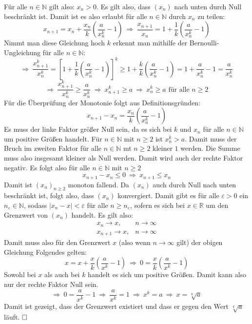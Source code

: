 \documentclass[10pt, a4paper]{article}
\begin{document}
		Für alle $n \in \mathbb{N}$ gilt also: $x_n > 0$. Es gilt also, dass $(x_n)$ nach unten durch Null beschränkt ist. Damit ist es also erlaubt für alle $n \in \mathbb{N}$ durch $x_n$ zu teilen:
		\[
			x_{n+1} = x_n + \frac{x_n}{k}\left( \frac{a}{x_n^k} - 1 \right) \ \Rightarrow \ \dfrac{x_{n+1}}{x_n} = 1 + \dfrac{1}{k}\left( \frac{a}{x_n^k} - 1 \right)
		\]
		Nimmt man diese Gleichung hoch $k$ erkennt man mithilfe der Bernoulli-Ungleichung für alle $n \in \mathbb{N}$:
		\[
			\Rightarrow \ \dfrac{x_{n+1}^k}{x_n^k} = \left[ 1 + \dfrac{1}{k}\left( \frac{a}{x_n^k} - 1 \right) \right]^k \geq 1 + \dfrac{k}{k}\left( \frac{a}{x_n^k} - 1 \right) = 1 + \frac{a}{x_n^k} -1 = \frac{a}{x_n^k}
		\]
		\[
			\Rightarrow \ \dfrac{x_{n+1}^k}{x_n^k} \geq \frac{a}{x_n^k} \ \Rightarrow \ x_{n+1}^k \geq a \ \Rightarrow \ x_n^k \geq a \text{ für alle } n \geq 2
		\]
		Für die Überprüfung der Monotonie folgt aus Definitionsgründen:
		\[
			x_{n+1} - x_n = \frac{x_n}{k}\left( \frac{a}{x_n^k} - 1 \right)
		\]
		Es muss der linke Faktor größer Null sein, da es sich bei $k$ und $x_n$ für alle $n \in \mathbb{N}$ um positive Größen handelt. Für $n \in \mathbb{N}$ mit $n \geq 2$ ist $x_n^k > a$. Damit muss der Bruch im zweiten Faktor für alle $n \in \mathbb{N}$ mt $n \geq 2$ kleiner $1$ werden. Die Summe muss also insgesamt kleiner als Null werden. Damit wird auch der rechte Faktor negativ. Es folgt also für alle $n\in \mathbb{N}$ mit $n \geq 2$
		\[
			x_{n+1} - x_n \leq 0 \ \Rightarrow \ x_{n+1} \leq x_n
		\]
		Damit ist $(x_n)_{n\geq2}$ monoton fallend. Da $(x_n)$ auch durch Null nach unten beschränkt ist, folgt also, dass $(x_n)$ konvergiert. Damit gibt es für alle $\varepsilon > 0$ ein $n_{\varepsilon}\in \mathbb{N}$, sodass $|x_n-x| < \varepsilon$ für alle $n \geq n_{\varepsilon}$, sofern es sich bei $x \in \mathbb{R}$ um den Grenzwert von $(x_n)$ handelt. Es gilt also:
		\begin{eqnarray*}
			x_n \longrightarrow x,&  n \longrightarrow \infty \\
			x_{n+1} \longrightarrow x,&  n \longrightarrow \infty
		\end{eqnarray*}
		Damit muss also für den Grenzwert $x$ (also wenn $n \longrightarrow \infty$ gilt) der obigen Gleichung Folgendes gelten:
		\[
			x = x + \frac{x}{k}\left( \frac{a}{x^k} - 1 \right) \ \Rightarrow \ 0 = \frac{x}{k}\left( \frac{a}{x^k} - 1 \right)
		\]
		Sowohl bei $x$ als auch bei $k$ handelt es sich um positive Größen. Damit kann also nur der rechte Faktor Null sein.
		\[
			\Rightarrow \ 0 = \frac{a}{x^k} - 1 \ \Rightarrow \ \frac{a}{x^k} = 1 \ \Rightarrow \ x^k = a \ \Rightarrow \ x = \sqrt[k]{a}
		\]
		Damit ist gezeigt, dass der Grenzwert existiert und dass er gegen den Wert $\sqrt[k]{a}$ läuft. $\hfill\Box$
		
\end{document}
